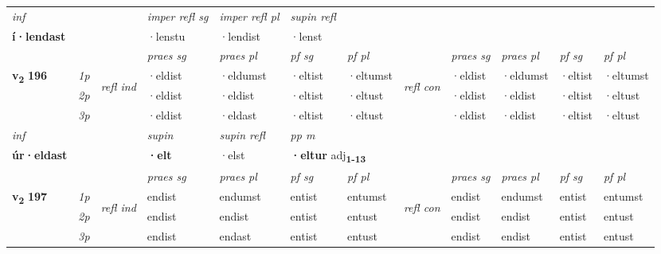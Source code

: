 \begin{longtable}[l]{X>{\footnotesize\itshape}llXXXXlXXXX}
   {\textit{inf}} & &   & \textit{imper refl sg} & \textit{imper refl pl}   & \textit{supin refl}  \\*
  {\textbf{í\allowbreak ·lendast}} & &   & ·lenstu & ·lendist   & ·lenst  \\*

\midrule

 & &   & \textit{praes sg}  & \textit{praes pl}    & \textit{ pf sg} & \textit{pf pl} & & \textit{praes sg}  & \textit{praes pl}    & \textit{pf sg} & \textit{pf pl }  \\ \cmidrule{4-7} \cmidrule{9-12}
 \multirow{2}{*}{{{\textbf{v{\textsubscript{2}}} \Large{\textbf{196}}}}}  & 1p & \multirow{3}{*}{\begin{turn}{90}\textit{refl ind}\end{turn}}  & ·eldist & ·eldumst & ·eltist & ·eltumst & \multirow{3}{*}{\begin{turn}{90}\textit{refl con}\end{turn}}  &·eldist & ·eldumst & ·eltist & ·eltumst \\*
 & 2p &  & ·eldist & ·eldist & ·eltist & ·eltust & &·eldist & ·eldist & ·eltist & ·eltust \\*
 & 3p  & & ·eldist & ·eldast & ·eltist & ·eltust & & ·eldist & ·eldist& ·eltist & ·eltust \\*
\cmidrule{4-7} \cmidrule{9-12}

   {\textit{inf}} & &      & \textit{supin} & \textit{supin refl} & \textit{pp m} \\*
  {\textbf{úr\allowbreak ·eldast}} & &      &  \textbf{·elt} & ·elst & \multicolumn{2}{l}{\textbf{·eltur} adj\textbf{\textsubscript{1-13}}} \\*

\midrule

 & &   & \textit{praes sg}  & \textit{praes pl}    & \textit{ pf sg} & \textit{pf pl} & & \textit{praes sg}  & \textit{praes pl}    & \textit{pf sg} & \textit{pf pl }  \\ \cmidrule{4-7} \cmidrule{9-12}
 \multirow{2}{*}{{{\textbf{v{\textsubscript{2}}} \Large{\textbf{197}}}}}  & 1p & \multirow{3}{*}{\begin{turn}{90}\textit{refl ind}\end{turn}}  & endist & endumst & entist & entumst & \multirow{3}{*}{\begin{turn}{90}\textit{refl con}\end{turn}}  &endist & endumst & entist & entumst \\*
 & 2p &  & endist & endist & entist & entust & &endist & endist & entist & entust \\*
 & 3p  & & endist & endast & entist & entust & & endist & endist& entist & entust \\*
\cmidrule{4-7} \cmidrule{9-12}


\end{longtable}
